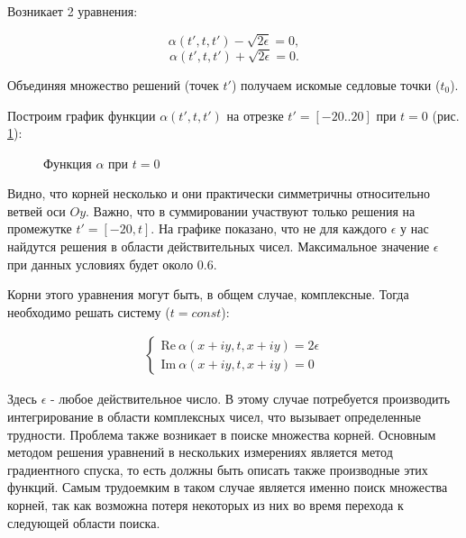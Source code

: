 \documentclass[%
bachelor,    %
natbib,      %
subf,        %
href,        %
colorlinks,  %
]{disser}
\renewcommand{\Re}{\mathrm{Re}}
\renewcommand{\Im}{\mathrm{Im}}
\begin{document}
Возникает 2 уравнения:

$$\alpha(t', t, t') - \sqrt{2\epsilon} = 0,$$
$$\alpha(t', t, t') + \sqrt{2\epsilon} = 0.$$

Объединяя множество решений (точек $t'$) получаем искомые седловые точки ($t_0$).

Построим график функции $\alpha(t', t, t')$ на отрезке $t' = [-20..20]$ при $t = 0$ (рис. \ref{ris:alpha-20..0}):

\begin{figure}[h]
	\caption{Функция $\alpha$ при $t = 0$}
	\label{ris:alpha-20..0}
\end{figure}

Видно, что корней несколько и они практически симметричны относительно ветвей оси $O y$. Важно, что в суммировании участвуют только решения на промежутке $t' = [-20, t]$. 
На графике показано, что не для каждого $\epsilon$ у нас найдутся решения в области действительных чисел. Максимальное значение $\epsilon$ при данных условиях будет около 0.6.

Корни этого уравнения могут быть, в общем случае, комплексные. Тогда необходимо решать систему ($t = const$):

\begin{eqnarray}
\begin{cases}
\Re \ \alpha(x+i y, t, x+i y) = 2\epsilon \nonumber\\
\Im \ \alpha(x+i y, t, x+i y) = 0 \nonumber
\end{cases}
\end{eqnarray}

Здесь $\epsilon$ - любое действительное число. В этому случае потребуется производить интегрирование в области комплексных чисел, что вызывает определенные трудности. Проблема также возникает в поиске множества корней. Основным методом решения уравнений в нескольких измерениях является метод градиентного спуска, то есть должны быть описать также производные этих функций. Самым трудоемким в таком случае является именно поиск множества корней, так как возможна потеря некоторых из них во время перехода к следующей области поиска.
\end{document}
